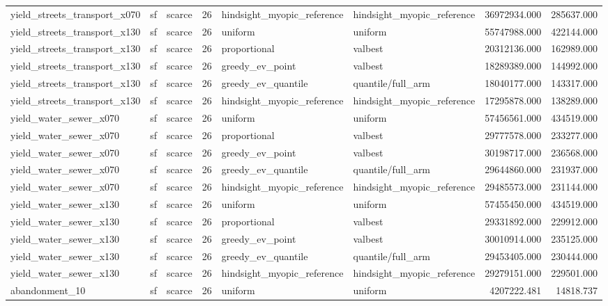 \begin{tabular}{lllrllrr}
yield\_streets\_transport\_x070 & sf & scarce & 26 & hindsight\_myopic\_reference & hindsight\_myopic\_reference & 36972934.000 & 285637.000 \\
yield\_streets\_transport\_x130 & sf & scarce & 26 & uniform & uniform & 55747988.000 & 422144.000 \\
yield\_streets\_transport\_x130 & sf & scarce & 26 & proportional & valbest & 20312136.000 & 162989.000 \\
yield\_streets\_transport\_x130 & sf & scarce & 26 & greedy\_ev\_point & valbest & 18289389.000 & 144992.000 \\
yield\_streets\_transport\_x130 & sf & scarce & 26 & greedy\_ev\_quantile & quantile/full\_arm & 18040177.000 & 143317.000 \\
yield\_streets\_transport\_x130 & sf & scarce & 26 & hindsight\_myopic\_reference & hindsight\_myopic\_reference & 17295878.000 & 138289.000 \\
yield\_water\_sewer\_x070 & sf & scarce & 26 & uniform & uniform & 57456561.000 & 434519.000 \\
yield\_water\_sewer\_x070 & sf & scarce & 26 & proportional & valbest & 29777578.000 & 233277.000 \\
yield\_water\_sewer\_x070 & sf & scarce & 26 & greedy\_ev\_point & valbest & 30198717.000 & 236568.000 \\
yield\_water\_sewer\_x070 & sf & scarce & 26 & greedy\_ev\_quantile & quantile/full\_arm & 29644860.000 & 231937.000 \\
yield\_water\_sewer\_x070 & sf & scarce & 26 & hindsight\_myopic\_reference & hindsight\_myopic\_reference & 29485573.000 & 231144.000 \\
yield\_water\_sewer\_x130 & sf & scarce & 26 & uniform & uniform & 57455450.000 & 434519.000 \\
yield\_water\_sewer\_x130 & sf & scarce & 26 & proportional & valbest & 29331892.000 & 229912.000 \\
yield\_water\_sewer\_x130 & sf & scarce & 26 & greedy\_ev\_point & valbest & 30010914.000 & 235125.000 \\
yield\_water\_sewer\_x130 & sf & scarce & 26 & greedy\_ev\_quantile & quantile/full\_arm & 29453405.000 & 230444.000 \\
yield\_water\_sewer\_x130 & sf & scarce & 26 & hindsight\_myopic\_reference & hindsight\_myopic\_reference & 29279151.000 & 229501.000 \\
abandonment\_10 & sf & scarce & 26 & uniform & uniform & 4207222.481 & 14818.737 \\

\end{tabular}
